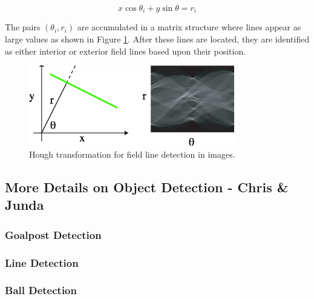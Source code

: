 \documentclass{article}
\begin{document}
	\begin{equation}
		x \cos \theta_{i} + y \sin \theta = r_{i} 
	\end{equation}

	The pairs \((\theta_{i},r_{i})\) are accumulated in a matrix structure where lines appear as large values as shown in Figure \ref{fig:Hough}. After these lines are located, they are identified as either interior or exterior field lines based upon their position.

	\begin{figure}[H]
		\centering
		\includegraphics[width=0.8\textwidth]{figures/Hough.eps}
		\caption{Hough transformation for field line detection in images.}
  		\label{fig:Hough}
	\end{figure}

\subsection{More Details on Object Detection - Chris \& Junda}


\subsubsection{Goalpost Detection}


\subsubsection{Line Detection}


\subsubsection{Ball Detection}
\end{document}
